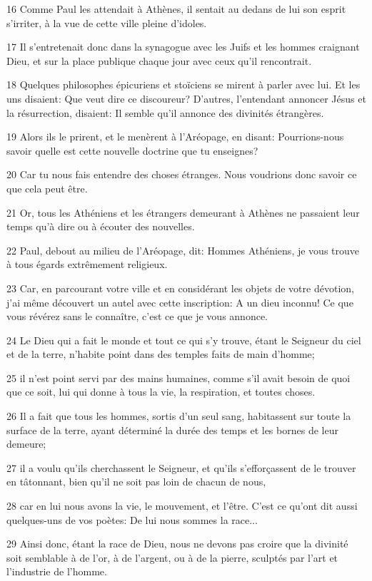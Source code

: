 \par 16 Comme Paul les attendait à Athènes, il sentait au dedans de lui son esprit s'irriter, à la vue de cette ville pleine d'idoles.
\par 17 Il s'entretenait donc dans la synagogue avec les Juifs et les hommes craignant Dieu, et sur la place publique chaque jour avec ceux qu'il rencontrait.
\par 18 Quelques philosophes épicuriens et stoïciens se mirent à parler avec lui. Et les uns disaient: Que veut dire ce discoureur? D'autres, l'entendant annoncer Jésus et la résurrection, disaient: Il semble qu'il annonce des divinités étrangères.
\par 19 Alors ils le prirent, et le menèrent à l'Aréopage, en disant: Pourrions-nous savoir quelle est cette nouvelle doctrine que tu enseignes?
\par 20 Car tu nous fais entendre des choses étranges. Nous voudrions donc savoir ce que cela peut être.
\par 21 Or, tous les Athéniens et les étrangers demeurant à Athènes ne passaient leur temps qu'à dire ou à écouter des nouvelles.
\par 22 Paul, debout au milieu de l'Aréopage, dit: Hommes Athéniens, je vous trouve à tous égards extrêmement religieux.
\par 23 Car, en parcourant votre ville et en considérant les objets de votre dévotion, j'ai même découvert un autel avec cette inscription: A un dieu inconnu! Ce que vous révérez sans le connaître, c'est ce que je vous annonce.
\par 24 Le Dieu qui a fait le monde et tout ce qui s'y trouve, étant le Seigneur du ciel et de la terre, n'habite point dans des temples faits de main d'homme;
\par 25 il n'est point servi par des mains humaines, comme s'il avait besoin de quoi que ce soit, lui qui donne à tous la vie, la respiration, et toutes choses.
\par 26 Il a fait que tous les hommes, sortis d'un seul sang, habitassent sur toute la surface de la terre, ayant déterminé la durée des temps et les bornes de leur demeure;
\par 27 il a voulu qu'ils cherchassent le Seigneur, et qu'ils s'efforçassent de le trouver en tâtonnant, bien qu'il ne soit pas loin de chacun de nous,
\par 28 car en lui nous avons la vie, le mouvement, et l'être. C'est ce qu'ont dit aussi quelques-uns de vos poètes: De lui nous sommes la race...
\par 29 Ainsi donc, étant la race de Dieu, nous ne devons pas croire que la divinité soit semblable à de l'or, à de l'argent, ou à de la pierre, sculptés par l'art et l'industrie de l'homme.
